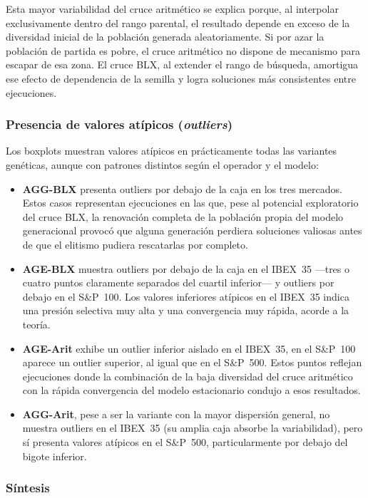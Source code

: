 Esta mayor variabilidad del cruce aritmético se explica porque, al interpolar exclusivamente dentro del rango parental, el resultado depende en exceso de la diversidad inicial de la población generada aleatoriamente. Si por azar la población de partida es pobre, el cruce aritmético no dispone de mecanismo para escapar de esa zona. El cruce BLX, al extender el rango de búsqueda, amortigua ese efecto de dependencia de la semilla y logra soluciones más consistentes entre ejecuciones.

\subsubsection*{Presencia de valores atípicos (\textit{outliers})}

Los boxplots muestran valores atípicos en prácticamente todas las variantes genéticas, aunque con patrones distintos según el operador y el modelo:

\begin{itemize}
    \item \textbf{AGG-BLX} presenta outliers por debajo de la caja en los tres mercados. Estos casos representan ejecuciones en las que, pese al potencial exploratorio del cruce BLX, la renovación completa de la población propia del modelo generacional provocó que alguna generación perdiera soluciones valiosas antes de que el elitismo pudiera rescatarlas por completo.
    \item \textbf{AGE-BLX} muestra outliers por debajo de la caja en el IBEX~35 ---tres o cuatro puntos claramente separados del cuartil inferior--- y outliers por debajo en el S\&P~100. Los valores inferiores atípicos en el IBEX~35 indica una presión selectiva muy alta y una convergencia muy rápida, acorde a la teoría.
    \item \textbf{AGE-Arit} exhibe un outlier inferior aislado en el IBEX~35, en el S\&P~100 aparece un outlier superior, al igual que en el S\&P~500. Estos puntos reflejan ejecuciones donde la combinación de la baja diversidad del cruce aritmético con la rápida convergencia del modelo estacionario condujo a esos resultados.
    \item \textbf{AGG-Arit}, pese a ser la variante con la mayor dispersión general, no muestra outliers en el IBEX~35 (su amplia caja absorbe la variabilidad), pero sí presenta valores atípicos en el S\&P~500, particularmente por debajo del bigote inferior.
\end{itemize}

\subsubsection*{Síntesis}

